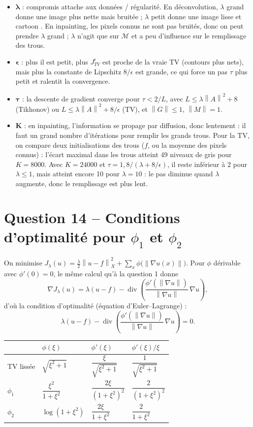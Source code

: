\documentclass[11pt,a4paper]{article}
\newcommand{\X}{X}
\newcommand{\nr}[1]{\left\| #1 \right\|}
\newcommand{\dive}{\operatorname{div}}
\begin{document}
\begin{itemize}[leftmargin=*]
  \item $\boldsymbol{\lambda}$ : compromis attache aux données / régularité.
    En déconvolution, $\lambda$ grand donne une image plus nette mais bruitée ; $\lambda$ petit donne une image
    lisse et \og cartoon \fg{}.
    En inpainting, les pixels connus ne sont pas bruités, donc on peut prendre $\lambda$ grand ; $\lambda$ n'agit
    que sur $\mathcal M$ et a peu d'influence sur le remplissage des trous.
  \item $\boldsymbol{\epsilon}$ : plus il est petit, plus $J^\epsilon_{TV}$ est proche de la vraie TV (contours plus
    nets), mais plus la constante de Lipschitz $8/\epsilon$ est grande, ce qui force un pas $\tau$ plus petit
    et ralentit la convergence.
  \item $\boldsymbol{\tau}$ : la descente de gradient converge pour $\tau < 2/L$, avec
    $L \le \lambda\nr{A}^2 + 8$ (Tikhonov) ou $L \le \lambda\nr{A}^2 + 8/\epsilon$ (TV), et $\nr{G}\le 1$,
    $\nr{M}=1$.
  \item $\boldsymbol{K}$ : en inpainting, l'information se propage par diffusion, donc lentement : il faut un
    grand nombre d'itérations pour remplir les grands trous. Pour la TV, on compare deux initialisations des trous
    ($f$, ou la moyenne des pixels connus) : l'écart maximal dans les trous atteint 49 niveaux de gris pour $K=8000$.
    Avec $K=24000$ et $\tau = 1{,}8/(\lambda+8/\epsilon)$, il reste inférieur à 2 pour $\lambda\le 1$, mais atteint encore
    10 pour $\lambda=10$ : le pas diminue quand $\lambda$ augmente, donc le remplissage est plus lent.
\end{itemize}

\section*{Question 14 -- Conditions d'optimalité pour $\phi_1$ et $\phi_2$}

On minimise $J_\lambda(u) = \frac{\lambda}{2}\nr{u-f}_\X^2 + \sum_x \phi\big(\nr{\nabla u(x)}\big)$.
Pour $\phi$ dérivable avec $\phi'(0)=0$, le même calcul qu'à la question 1 donne
\[
  \nabla J_\lambda(u) = \lambda(u-f) - \dive\!\left(\frac{\phi'(\nr{\nabla u})}{\nr{\nabla u}}\,\nabla u\right),
\]
d'où la condition d'optimalité (équation d'Euler--Lagrange) :
\[
  \boxed{\lambda(u-f) - \dive\!\left(\frac{\phi'(\nr{\nabla u})}{\nr{\nabla u}}\,\nabla u\right) = 0.}
\]

\begin{center}
\renewcommand{\arraystretch}{1.8}
\begin{tabular}{@{}llll@{}}
\toprule
 & $\phi(\xi)$ & $\phi'(\xi)$ & $\phi'(\xi)/\xi$ \\
\midrule
TV lissée & $\sqrt{\xi^2+1}$ & $\dfrac{\xi}{\sqrt{\xi^2+1}}$ & $\dfrac{1}{\sqrt{\xi^2+1}}$ \\
$\phi_1$ & $\dfrac{\xi^2}{1+\xi^2}$ & $\dfrac{2\xi}{(1+\xi^2)^2}$ & $\dfrac{2}{(1+\xi^2)^2}$ \\
$\phi_2$ & $\log(1+\xi^2)$ & $\dfrac{2\xi}{1+\xi^2}$ & $\dfrac{2}{1+\xi^2}$ \\
\bottomrule
\end{tabular}
\end{center}
\end{document}
